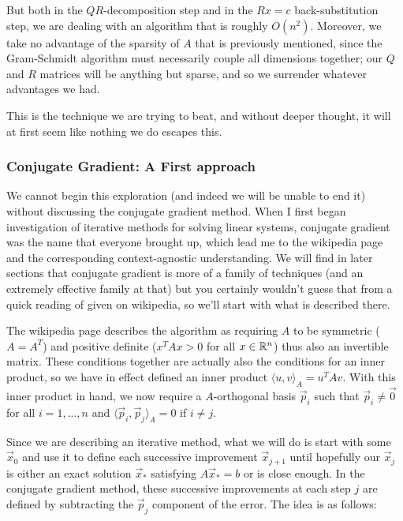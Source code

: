 \documentclass[11pt]{article}
\begin{document}
But both in the $QR$-decomposition step and in the $Rx = c$ back-substitution step, we are dealing with an algorithm that is roughly $O(n^2)$. Moreover, we take no advantage of the sparsity of $A$ that is previously mentioned, since the Gram-Schmidt algorithm must necessarily couple all dimensions together; our $Q$ and $R$ matrices will be anything but sparse, and so we surrender whatever advantages we had.

This is the technique we are trying to beat, and without deeper thought, it will at first seem like nothing we do escapes this.

\subsubsection{Conjugate Gradient: A First approach}

We cannot begin this exploration (and indeed we will be unable to end it) without discussing the conjugate gradient method. When I first began investigation of iterative methods for solving linear systems, conjugate gradient was the name that everyone brought up, which lead me to the wikipedia page and the corresponding context-agnostic understanding. We will find in later sections that conjugate gradient is more of a family of techniques (and an extremely effective family at that) but you certainly wouldn't guess that from a quick reading of given on wikipedia, so we'll start with what is described there.

The wikipedia page describes the algorithm as requiring $A$ to be symmetric ($A = A^T$) and positive definite ($x^TAx > 0$ for all $x \in \mathbb{R}^n$) thus also an invertible matrix. These conditions together are actually also the conditions for an inner product, so we have in effect defined an inner product $\langle u, v \rangle_A = u^T A v$. With this inner product in hand, we now require a $A$-orthogonal basis $\vec{p}_i$ such that $\vec{p}_i \neq \vec{0}$ for all $i = 1,...,n$ and $\langle \vec{p}_i, \vec{p}_j\rangle_A = 0$ if $i \neq j$.

Since we are describing an iterative method, what we will do is start with some $\vec x_0$ and use it to define each successive improvement $\vec x_{j+1}$ until hopefully our $\vec{x}_j$ is either an exact solution $\vec x_*$ satisfying $A\vec x_* = b$ or is close enough. In the conjugate gradient method, these successive improvements at each step $j$ are defined by subtracting the $\vec{p}_j$ component of the error. The idea is as follows:
\end{document}
